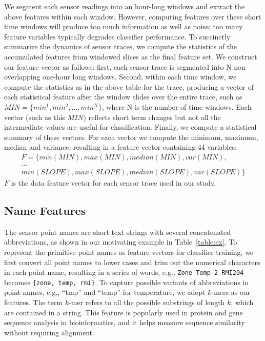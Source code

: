 We segment each sensor readings into an hour-long windows and extract the above features within each window. 
However, computing features over these short time windows will produce too much information as well as noise; too many feature variables typically degrades classifier performance.
To succinctly summarize the dynamics of sensor traces, we compute the statistics of the accumulated features from windowed slices as the final feature set. 
We construct our feature vector as follows: first, each sensor trace is segmented into N non-overlapping one-hour long windows. Second, within each time window, we compute the statistics as in the above table for the trace, producing a vector of each statistical feature after the window slides over the entire trace, such as 
$MIN = \{min^{1}, min^{2}, ..., min^{N}\}$, where N is the number of time windows. Each vector (such as this $MIN$) reflects short term changes but not all the intermediate values are useful for classification. 
Finally, we compute a statistical summary of these vectors. For each vector we compute the minimum, maximum, median and variance, resulting in a feature vector containing 44 variables:
\begin{displaymath}
\begin{split}
F = \{min(MIN), max(MIN), median(MIN), var(MIN),\\
...\\
min(SLOPE), max(SLOPE), median(SLOPE), var(SLOPE)\}
\end{split}
\end{displaymath}
$F$ is the data feature vector for each sensor trace used in our study.


\subsection{Name Features}
The sensor point names are short text strings with several concatenated abbreviations, as shown in our motivating example in Table~\ref{table:ex}. 
To represent the primitive point names as feature vectors for classifier training, we first convert all point names to lower cases and trim out the numerical characters in each point name, resulting in a series of words, e.g., \texttt{Zone Temp 2 RMI204} becomes \texttt{\{zone, temp, rmi\}}. 
To capture possible variants of abbreviations in point names, e.g., ``tmp'' and ``temp'' for temperature, we adopt $k$-mers \cite{leslie2004mismatch} as our features. 
The term $k$-mer refers to all the possible substrings of length $k$, which are contained in a string. This feature is popularly used in protein and gene sequence analysis in bioinformatics, and it helps measure sequence similarity without requiring alignment. 

